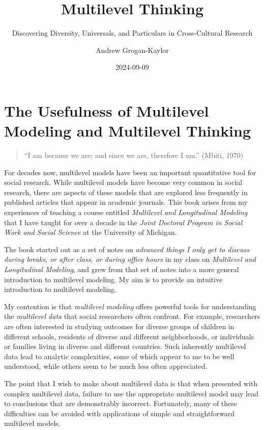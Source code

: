 \documentclass[
  letterpaper,
  DIV=11,
  numbers=noendperiod]{scrreprt}
\title{Multilevel Thinking}
\subtitle{Discovering Diversity, Universals, and Particulars in
Cross-Cultural Research}
\author{Andrew Grogan-Kaylor}
\date{2024-09-09}
\renewcommand*\contentsname{Table of contents}
\newcommand\contentsname{Table of contents}
\begin{document}
\maketitle

\renewcommand*\contentsname{Table of contents}
{
\hypersetup{linkcolor=}
\setcounter{tocdepth}{2}
\tableofcontents
}
\listoffigures
\listoftables
{}

\chapter{The Usefulness of Multilevel Modeling and Multilevel
Thinking}\label{sec-multilevel-thinking}

\begin{quote}
``I am because we are; and since we are, therefore I am.'' (Mbiti, 1970)
\end{quote}

For decades now, multilevel models have been an important quantitative
tool for social research. While multilevel models have become very
common in social research, there are aspects of these models that are
explored less frequently in published articles that appear in academic
journals. This book arises from my experiences of teaching a course
entitled \emph{Multilevel and Longitudinal Modeling} that I have taught
for over a decade in the \emph{Joint Doctoral Program in Social Work and
Social Science} at the University of Michigan.

The book started out as a set of notes on \emph{advanced things I only
get to discuss during breaks, or after class, or during office hours} in
my class on \emph{Multilevel and Longitudinal Modeling}, and grew from
that set of notes into a more general introduction to multilevel
modeling. My aim is to provide an intuitive introduction to multilevel
modeling.

My contention is that \emph{multilevel modeling} offers powerful tools
for understanding the \emph{multilevel data} that social researchers
often confront. For example, researchers are often interested in
studying outcomes for diverse groups of children in different schools,
residents of diverse and different neighborhoods, or individuals or
families living in diverse and different countries. Such inherently
multilevel data lead to analytic complexities, some of which appear to
me to be well understood, while others seem to be much less often
appreciated.

The point that I wish to make about multilevel data is that when
presented with complex multilevel data, failure to use the appropriate
multilevel model may lead to conclusions that are demonstrably
incorrect. Fortunately, many of these difficulties can be avoided with
applications of simple and straightforward multilevel models.
 
\end{document}
